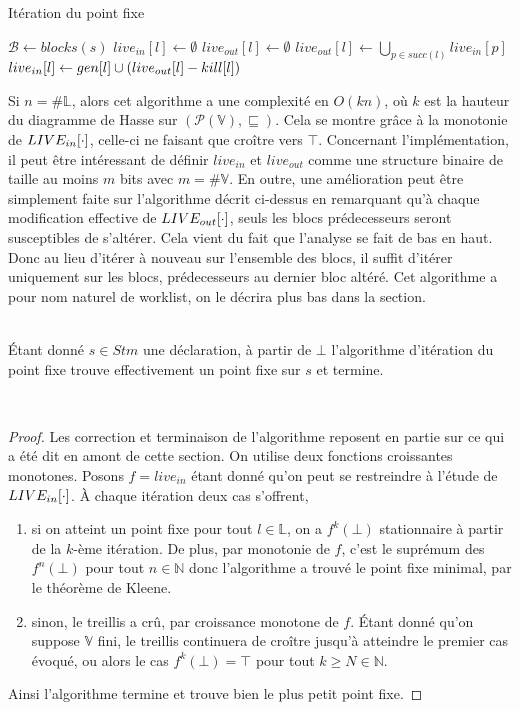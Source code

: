 \documentclass[a4paper, 10pt]{article}
\begin{document}
\begin{algorithm}[H]
	\caption{Itération du point fixe}
	\begin{algorithmic}
		\State $\mathcal{B} \leftarrow blocks(s)$
		\State $live_{in}[l] \leftarrow \emptyset$
		\State $live_{out}[l] \leftarrow \emptyset$
		\EndFor
		\State $live_{out}[l] \leftarrow \bigcup\limits_{p\in succ(l)} live_{in}[p]$
		\State $live_{in}[l] \leftarrow gen[l] \cup (live_{out}[l] - kill[l])$
		\EndFor
		\EndWhile
	\end{algorithmic}
\end{algorithm}
Si $n = \#\mathbb{L}$, alors cet algorithme a une complexité en $O(kn)$, où $k$ est la hauteur du diagramme
de Hasse sur $(\mathcal{P}(\mathbb{V}), \sqsubseteq)$. Cela se montre grâce à la monotonie de $LIVE_{in}[\cdot]$, 
celle-ci ne faisant que croître vers $\top$.
Concernant l'implémentation, il peut être intéressant de définir $live_{in}$ et $live_{out}$ comme une structure binaire de taille au
moins $m$ bits avec $m = \#\mathbb{V}$.
En outre, une amélioration peut être simplement faite sur l'algorithme décrit ci-dessus en remarquant qu'à chaque 
modification effective de $LIVE_{out}[\cdot]$, seuls les blocs prédecesseurs seront susceptibles de s'altérer. Cela
vient du fait que l'analyse se fait de bas en haut. Donc
au lieu d'itérer à nouveau sur l'ensemble des blocs, il suffit d'itérer uniquement sur les blocs, prédecesseurs au dernier
bloc altéré. Cet algorithme a pour nom naturel de worklist, on le décrira plus bas dans la section.
\\
\\
\begin{lemma}
	Étant donné $s \in Stm$ une déclaration, à partir de $\bot$ l'algorithme d'itération du point fixe trouve effectivement
	un point fixe sur $s$ et termine.
\end{lemma}
\\
\begin{proof}
Les correction et terminaison de l'algorithme reposent en partie sur ce qui a été dit en amont de cette section.
On utilise deux fonctions croissantes monotones. Posons $f = live_{in}$ étant donné qu'on peut se restreindre
à l'étude de $LIVE_{in}[\cdot]$. À chaque itération deux cas s'offrent,
\begin{enumerate}
	\item si on atteint un point fixe pour tout $l \in \mathbb{L}$, on a $f^k(\bot)$ stationnaire
	à partir de la $k$-ème itération. De plus, par monotonie de $f$, c'est le suprémum des $f^n(\bot)$ pour tout $n \in \mathbb{N}$ donc
	l'algorithme a trouvé le point fixe minimal, par le théorème de Kleene.
	\item sinon, le treillis a crû, par croissance monotone de $f$. Étant donné qu'on suppose $\mathbb{V}$ fini, le treillis continuera
	de croître jusqu'à atteindre le premier cas évoqué, ou alors le cas $f^k(\bot) = \top$ pour tout $k \ge N \in \mathbb{N}$.
\end{enumerate}
Ainsi l'algorithme termine et trouve bien le plus petit point fixe.
\end{proof}
\end{document}
